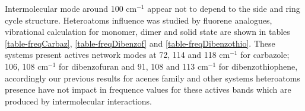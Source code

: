 Intermolecular mode around 100 cm$^{-1}$ appear not to depend to the side and ring cycle structure. Heteroatoms influence was studied by fluorene analogues, vibrational calculation for monomer, dimer and solid state are shown in tables \ref{table-freqCarbaz}, \ref{table-freqDibenzof} and \ref{table-freqDibenzothio}. These systems present actives network modes at 72, 114 and 118 cm$^{-1}$ for carbazole; 106, 108 cm$^{-1}$ for dibenzofuran and 91, 108 and 113 cm$^{-1}$ for dibenzothiophene, accordingly our previous results for acenes family and other systems heteroatoms presence have not impact in frequence values for these actives bands which are produced by intermolecular interactions. 

 
 \begin{table}[H]
 	\begin{center}
 		\caption{The \textit{bc} and \textit{ab} planes of Carbazole crystal}  \label{fig-carbazolesol}
 		\end{center}
 	\end{table}
 
